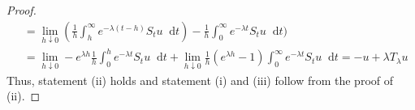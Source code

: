 \documentclass[12pt, reqno]{amsart}
\newcommand{\1}{\mathbbm 1}
\newcommand*\diff{\mathop{}\!\mathrm{d}}
\theoremstyle{plain}
\theoremstyle{definition}
\begin{document}
\begin{proof}
\begin{align*}
   &=\lim_{h \downarrow 0}(\frac{1}{h}\int_{h}^{\infty} e^{-\lambda( t-h)}S_{t} u\diff t)-\frac{1}{h}\int_{0}^{\infty} e^{-\lambda t}S_t u\diff t)\\
   &=\lim_{h \downarrow 0}- e^{\lambda h}\frac{1}{h}\int_{0}^{h} e^{-\lambda t}S_t u\diff t+\lim_{h \downarrow 0}\frac{1}{h}(e^{\lambda h}-1)\int_{0}^{\infty} e^{-\lambda t}S_t u\diff t=-u+\lambda T_{\lambda}u
\end{align*}
Thus, statement (ii) holds and statement (i) and (iii) follow from the proof of (ii).
\end{proof}
\newpage


\end{document}
